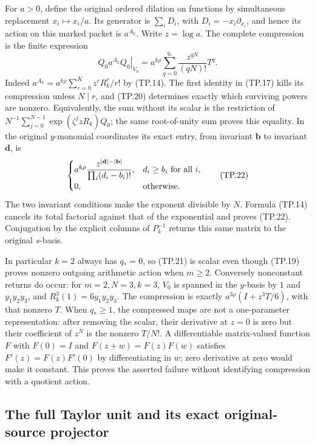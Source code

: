For \(a>0\), define the original ordered dilation on
functions by simultaneous replacement \(x_i\mapsto x_i/a\).
Its generator is \(\sum_iD_i\), with
\(D_i=-x_i\partial_{x_i}\), and hence its action on this
marked packet is \(a^{A_k}\). Write \(z=\log a\).
The complete compression is the finite expression
\[
 \left.Q_0a^{A_k}Q_0\right|_{V_0}
   =a^{k\rho}\sum_{q=0}^{q_*}
          \frac{z^{qN}}{(qN)!}T^q.
 \tag{TP.21}\label{eq:tp-dilation}
\]
Indeed \(a^{A_k}=a^{k\rho}\sum_{r=0}^{K}z^rR_k^r/r!\)
by (TP.14). The first identity in (TP.17) kills its
compression unless \(N\mid r\), and (TP.20) determines
exactly which surviving powers are nonzero. Equivalently,
the sum without its scalar is the restriction of
\(N^{-1}\sum_{j=0}^{N-1}\exp(\zeta^jzR_k)Q_0\);
the same root-of-unity sum proves this equality.
In the original \(y\)-monomial coordinates its exact
entry, from invariant \(\mathbf b\) to invariant
\(\mathbf d\), is
\[
 \begin{cases}
 a^{k\rho}\displaystyle\frac{z^{|\mathbf d|-|\mathbf b|}}
                    {\prod_i(d_i-b_i)!},&d_i\geq b_i\ \hbox{for all }i,\\
 0,&\hbox{otherwise}.
 \end{cases}
 \tag{TP.22}\label{eq:tp-entry}
\]
The two invariant conditions make the exponent divisible
by \(N\). Formula (TP.14) cancels its total factorial
against that of the exponential and proves (TP.22).
Conjugation by the explicit columns of \(P_k^{-1}\)
returns this same matrix to the original \(s\)-basis.

In particular \(k=2\) always has \(q_*=0\), so (TP.21)
is scalar even though (TP.19) proves nonzero outgoing
arithmetic action when \(m\geq2\). Conversely nonconstant
returns do occur: for \(m=2,N=3,k=3\), \(V_0\) is spanned
in the \(y\)-basis by \(1\) and \(y_1y_2y_3\), and
\(R_k^3(1)=6y_1y_2y_3\). The compression is exactly
\(a^{3\rho}(I+z^3T/6)\), with that nonzero \(T\).
When \(q_*\geq1\), the compressed maps are not a
one-parameter representation: after removing the scalar,
their derivative at \(z=0\) is zero but their coefficient
of \(z^N\) is the nonzero \(T/N!\). A differentiable
matrix-valued function \(F\) with \(F(0)=I\) and
\(F(z+w)=F(z)F(w)\) satisfies \(F'(z)=F(z)F'(0)\)
by differentiating in \(w\); zero derivative at zero
would make it constant. This proves the asserted failure
without identifying compression with a quotient action.

\subsection{The full Taylor unit and its exact original-source projector}

